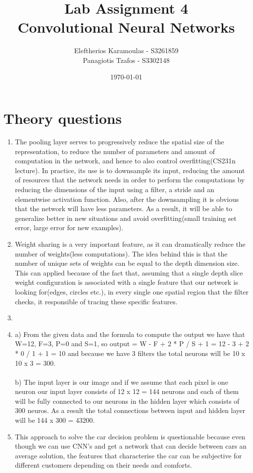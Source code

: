 \documentclass{article}
\title{Lab Assignment 4\\ {\Large Convolutional Neural Networks}}
\date{\today}
\author{
 	Eleftherios Karamoulas - S3261859\\ 
	Panagiotis Tzafos - S3302148\\
}
\begin{document}
\maketitle
\section{Theory questions}
\begin{enumerate}
\item The pooling layer serves to progressively reduce the spatial size of the representation, to reduce the number of parameters and amount of computation in the network, and hence to also control overfitting(CS231n lecture). In practice, its use is to downsample its input, reducing the amount of resources that the network needs in order to perform the computations by reducing the dimensions of the input using a filter, a stride and an elementwise activation function. Also, after the downsampling it is obvious that the network will have less parameters. As a result, it will be able to generalize better in new situations and avoid overfitting(small training set error, large error for new examples). 
\item
Weight sharing is a very important feature, as it can dramatically reduce the number of weights(less computations). The idea behind this is that the number of unique sets of weights can be equal to the depth dimension size. This can applied because of the fact that, assuming that a single depth slice weight configuration is associated with a single feature that our network is looking for(edges, circles etc.), in every single one spatial region that the filter checks, it responsible of tracing these specific features.
\item
\item a) From the given data and the formula to compute the output we have that W=12, F=3, P=0 and S=1, so output = W - F + 2 * P / S + 1 = 12 - 3 + 2 * 0 / 1 + 1 =  10 and because we have 3 filters the total neurons will be 10 x 10 x 3 = 300.\\
\\
b) The input layer is our image and if we assume that  each pixel is one neuron our input layer consists of 12 x 12 = 144 neurons and each of them will be fully connected to our neurons in the hidden layer which consists of 300 neuros. As a result the total connections between input and hidden layer will be 144 x 300 = 43200.
\item This approach to solve the car decision problem is questionable because even though we can use CNN's and get a network that can decide between cars an average solution, the features that characterise the car can be subjective for different customers depending on their needs and comforts.
\end{enumerate}
\end{document}
